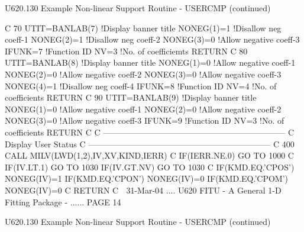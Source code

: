  
   U620.130  Example Non-linear Support Routine - USERCMP (continued)
 
   C
      70 UTIT=BANLAB(7)                          !Display banner title
         NONEG(1)=1                              !Disallow neg   coeff-1
         NONEG(2)=1                              !Disallow neg   coeff-2
         NONEG(3)=0                              !Allow negative coeff-3
         IFUNK=7                                 !Function ID
         NV=3                                    !No. of coefficiemts
         RETURN
   C
      80 UTIT=BANLAB(8)                          !Display banner title
         NONEG(1)=0                              !Allow negative coeff-1
         NONEG(2)=0                              !Allow negative coeff-2
         NONEG(3)=0                              !Allow negative coeff-3
         NONEG(4)=1                              !Disallow neg   coeff-4
         IFUNK=8                                 !Function ID
         NV=4                                    !No. of coefficients
         RETURN
   C
      90 UTIT=BANLAB(9)                          !Display banner title
         NONEG(1)=0                              !Allow negative coeff-1
         NONEG(2)=0                              !Allow negative coeff-2
         NONEG(3)=0                              !Allow negative coeff-3
         IFUNK=9                                 !Function ID
         NV=3                                    !No. of coefficients
         RETURN
   C
   C     ------------------------------------------------------------------
   C     Display User Status
   C     ------------------------------------------------------------------
   C
     400 CALL MILV(LWD(1,2),IV,XV,KIND,IERR)
   C
         IF(IERR.NE.0) GO TO 1000
   C
         IF(IV.LT.1)   GO TO 1030
         IF(IV.GT.NV)  GO TO 1030
   C
         IF(KMD.EQ.'CPOS') NONEG(IV)=1
         IF(KMD.EQ.'CPON') NONEG(IV)=0
         IF(KMD.EQ.'CPOM') NONEG(IV)=0
   C
         RETURN
   C
    
   31-Mar-04 .... U620  FITU - A General 1-D Fitting Package - ...... PAGE  14
 
 
   U620.130  Example Non-linear Support Routine - USERCMP (continued)
 
